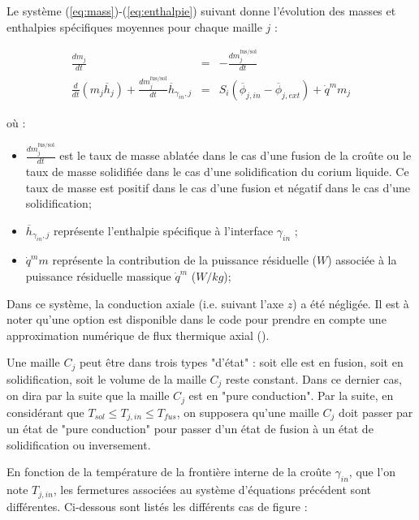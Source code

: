 Le système (\ref{eq:mass})-(\ref{eq:enthalpie}) suivant donne l'évolution des masses et enthalpies spécifiques moyennes pour chaque maille $j$ :

\begin{eqnarray}
\frac{dm_{j}}{dt} &=& - \frac{dm_{j}^\text{fus/sol}}{dt} \label{eq:mass} \\ 
 \frac{d}{dt}(m_{j}\overline{h}_{j}) + \frac{dm_{j}^\text{fus/sol}}{dt} \overline{h}_{\gamma_{in},j} & = & S_i\left(\overline{\phi}_{j,in} - \overline{\phi}_{j,ext}\right) + \dot{q}^m m_{j} \label{eq:enthalpie}
\end{eqnarray}

où :

\begin{itemize}
 \item $\frac{dm_j^\text{fus/sol}}{dt}$ est le taux de masse ablatée dans le cas d'une fusion de la croûte ou le taux de masse solidifiée dans le cas d'une solidification du corium liquide. Ce taux de masse est positif dans le cas d'une fusion et négatif dans le cas d'une solidification;
 \item $\overline{h}_{\gamma_{in},j}$ représente l'enthalpie spécifique à l’interface $\gamma_{in}$ ;
 \item $\dot{q}^m m$ représente la contribution de la puissance résiduelle ($W$) associée à la puissance résiduelle massique $\dot{q}^m$ ($W/kg$);
\end{itemize}
Dans ce système, la conduction axiale (i.e. suivant l'axe $z$) a été négligée. Il est à noter qu'une option est disponible dans le code pour prendre en compte une approximation numérique de flux thermique axial (\cite{Peybernes2018}). 

Une maille $C_j$ peut être dans trois types "d'état" : soit elle est en fusion, soit en solidification, soit le volume de la maille $C_j$ reste constant. Dans ce dernier cas, on dira par la suite que la maille $C_j$ est en "pure conduction". Par la suite, en considérant que $T_{sol}\leq T_{j,in}\leq T_{fus}$, on supposera qu'une maille $C_j$ doit passer par un état de "pure conduction" pour passer d'un état de fusion à un état de solidification ou inversement.

En fonction de la température de la frontière interne de la croûte $\gamma_{in}$, que l'on note $T_{j,in}$, les fermetures associées au système d'équations précédent sont différentes. Ci-dessous sont listés les différents cas de figure :\\

